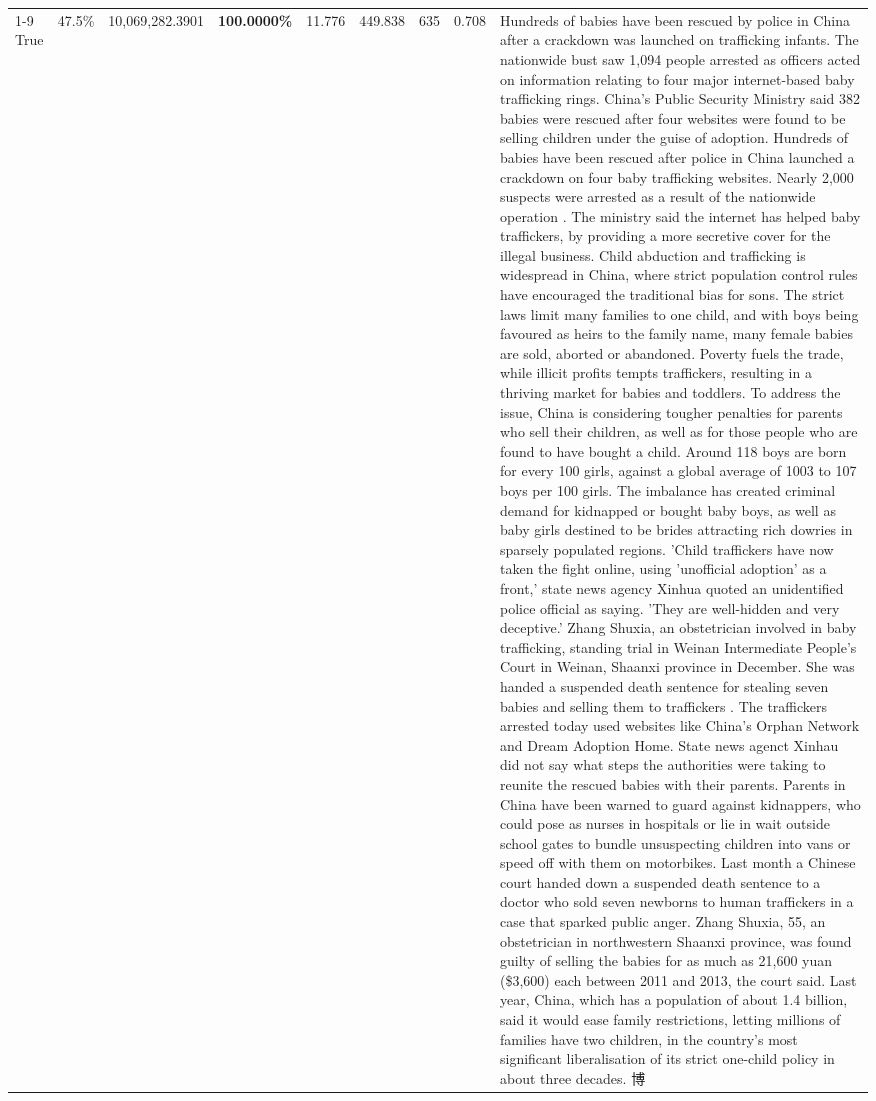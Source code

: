 \begin{table}[H]
\begin{tabular}{lllrlllll}
\cline{1-9}
True & 47.5\% & 10,069,282.3901 & \bfseries \color{red} 100.0000\% & 11.776 & 449.838 & 635 & 0.708 & Hundreds of babies have been rescued by police in China after a crackdown was launched on trafficking infants. The nationwide bust saw 1,094 people arrested as officers acted on information relating to four major internet-based baby trafficking rings. China's Public Security Ministry said 382 babies were rescued after four websites were found to be selling children under the guise of adoption. Hundreds of babies have been rescued after police in China launched a crackdown on four baby trafficking websites. Nearly 2,000 suspects were arrested as a result of the nationwide operation . The ministry said the internet has helped baby traffickers, by providing a more secretive cover for the illegal business. Child abduction and trafficking is widespread in China, where strict population control rules have encouraged the traditional bias for sons. The strict laws limit many families to one child, and with boys being favoured as heirs to the family name, many female babies are sold, aborted or abandoned. Poverty fuels the trade, while illicit profits tempts traffickers, resulting in a thriving market for babies and toddlers. To address the issue, China is considering tougher penalties for parents who sell their children, as well as for those people who are found to have bought a child. Around 118 boys are born for every 100 girls, against a global average of 1003 to 107 boys per 100 girls. The imbalance has created criminal demand for kidnapped or bought baby boys, as well as baby girls destined to be brides attracting rich dowries in sparsely populated regions. 'Child traffickers have now taken the fight online, using 'unofficial adoption' as a front,' state news agency Xinhua quoted an unidentified police official as saying. 'They are well-hidden and very deceptive.' Zhang Shuxia, an obstetrician involved in baby trafficking, standing trial in Weinan Intermediate People's Court in Weinan, Shaanxi province in December. She was handed a suspended death sentence for stealing seven babies and selling them to traffickers . The traffickers arrested today used websites like China's Orphan Network and Dream Adoption Home. State news agenct Xinhau did not say what steps the authorities were taking to reunite the rescued babies with their parents. Parents in China have been warned to guard against kidnappers, who could pose as nurses in hospitals or lie in wait outside school gates to bundle unsuspecting children into vans or speed off with them on motorbikes. Last month a Chinese court handed down a suspended death sentence to a doctor who sold seven newborns to human traffickers in a case that sparked public anger. Zhang Shuxia, 55, an obstetrician in northwestern Shaanxi province, was found guilty of selling the babies for as much as 21,600 yuan (\$3,600) each between 2011 and 2013, the court said. Last year, China, which has a population of about 1.4 billion, said it would ease family restrictions, letting millions of families have two children, in the country's most significant liberalisation of its strict one-child policy in about three decades. 博 \\

\end{tabular}
\end{table}
